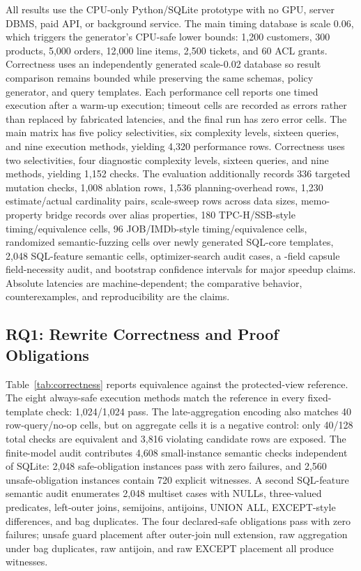 \documentclass[conference]{IEEEtran}
\begin{document}
All results use the CPU-only Python/SQLite prototype with no GPU, server DBMS, paid API, or background service. The main timing database is scale 0.06, which triggers the generator's CPU-safe lower bounds: 1,200 customers, 300 products, 5,000 orders, 12,000 line items, 2,500 tickets, and 60 ACL grants. Correctness uses an independently generated scale-0.02 database so result comparison remains bounded while preserving the same schemas, policy generator, and query templates. Each performance cell reports one timed execution after a warm-up execution; timeout cells are recorded as errors rather than replaced by fabricated latencies, and the final run has zero error cells. The main matrix has five policy selectivities, six complexity levels, sixteen queries, and nine execution methods, yielding 4,320 performance rows. Correctness uses two selectivities, four diagnostic complexity levels, sixteen queries, and nine methods, yielding 1,152 checks. The evaluation additionally records 336 targeted mutation checks, 1,008 ablation rows, 1,536 planning-overhead rows, 1,230 estimate/actual cardinality pairs, \ScaleSweepRows{} scale-sweep rows across \ScaleSweepSizes{} data sizes, \MemoCandidateRecords{} memo-property bridge records over \MemoAliasPropertyRecords{} alias properties, 180 TPC-H/SSB-style timing/equivalence cells, 96 JOB/IMDb-style timing/equivalence cells, \RandomFuzzRows{} randomized semantic-fuzzing cells over \RandomFuzzTemplates{} newly generated SQL-core templates, 2,048 SQL-feature semantic cells, \OptimizerSearchCases{} optimizer-search audit cases, a \CapsuleFieldsTested{}-field capsule field-necessity audit, and bootstrap confidence intervals for major speedup claims. Absolute latencies are machine-dependent; the comparative behavior, counterexamples, and reproducibility are the claims.



\subsection{RQ1: Rewrite Correctness and Proof Obligations}
Table~\ref{tab:correctness} reports equivalence against the protected-view reference. The eight always-safe execution methods match the reference in every fixed-template check: 1,024/1,024 pass. The late-aggregation encoding also matches 40 row-query/no-op cells, but on aggregate cells it is a negative control: only 40/128 total checks are equivalent and 3,816 violating candidate rows are exposed. The finite-model audit contributes 4,608 small-instance semantic checks independent of SQLite: 2,048 safe-obligation instances pass with zero failures, and 2,560 unsafe-obligation instances contain 720 explicit witnesses. A second SQL-feature semantic audit enumerates 2,048 multiset cases with NULLs, three-valued predicates, left-outer joins, semijoins, antijoins, UNION ALL, EXCEPT-style differences, and bag duplicates. The four declared-safe obligations pass with zero failures; unsafe guard placement after outer-join null extension, raw aggregation under bag duplicates, raw antijoin, and raw EXCEPT placement all produce witnesses. 
\end{document}
